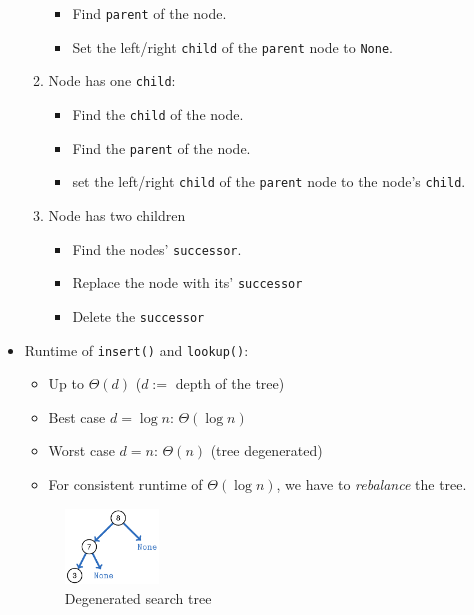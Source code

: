 \documentclass[12pt, a4paper]{scrartcl}
\begin{document}
\begin{itemize}
\begin{enumerate}
\begin{itemize}
    \item Find \texttt{parent} of the node.
    \item Set the left/right \texttt{child} of the \texttt{parent} node to \texttt{None}.
    \end{itemize}
  \item Node has one \texttt{child}:
    \begin{itemize}
    \item Find the \texttt{child} of the node.
    \item Find the \texttt{parent} of the node.
    \item set the left/right \texttt{child} of the \texttt{parent} node to the node's \texttt{child}.
    \end{itemize}
  \item Node has two children
    \begin{itemize}
    \item Find the nodes' \texttt{successor}.
    \item Replace the node with its' \texttt{successor}
    \item Delete the \texttt{successor}
    \end{itemize}
\end{enumerate}
\item Runtime of \texttt{insert()} and \texttt{lookup()}:
  \begin{itemize}
  \item Up to $\Theta(d)$ ($d:=$ depth of the tree)
  \item Best case $d=\log n$: $\Theta(\log n)$
  \item Worst case $d=n$: $\Theta(n)$ (tree degenerated)
  \item For consistent runtime of $\Theta(\log n)$, we have to \emph{rebalance} the tree.
  \end{itemize}
  \begin{figure}[htbp]
    \centering
    \includegraphics[height=20mm]{search_tree_degenerated}
    \caption{Degenerated search tree}
  \end{figure}
\end{itemize}
\end{document}
